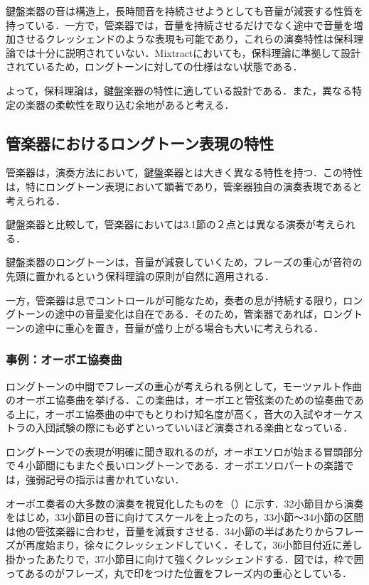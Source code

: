 鍵盤楽器の音は構造上，長時間音を持続させようとしても音量が減衰する性質を持っている．一方で，管楽器では，音量を持続させるだけでなく途中で音量を増加させるクレッシェンドのような表現も可能であり，これらの演奏特性は保科理論では十分に説明されていない．Mixtractにおいても，保科理論に準拠して設計されているため，ロングトーンに対しての仕様はない状態である．

よって，保科理論は，鍵盤楽器の特性に適している設計である．また，異なる特定の楽器の柔軟性を取り込む余地があると考える．
\subsection{管楽器におけるロングトーン表現の特性}
管楽器は，演奏方法において，鍵盤楽器とは大きく異なる特性を持つ．この特性は，特にロングトーン表現において顕著であり，管楽器独自の演奏表現であると考えられる．

鍵盤楽器と比較して，管楽器においては3.1節の２点とは異なる演奏が考えられる．

鍵盤楽器のロングトーンは，音量が減衰していくため，フレーズの重心が音符の先頭に置かれるという保科理論の原則が自然に適用される．

一方，管楽器は息でコントロールが可能なため，奏者の息が持続する限り，ロングトーンの途中の音量変化は自在である．そのため，管楽器であれば，ロングトーンの途中に重心を置き，音量が盛り上がる場合も大いに考えられる．
\subsubsection{事例：オーボエ協奏曲}
ロングトーンの中間でフレーズの重心が考えられる例として，モーツァルト作曲のオーボエ協奏曲\cite{oboe}を挙げる．この楽曲は，オーボエと管弦楽のための協奏曲である上に，オーボエ協奏曲の中でもとりわけ知名度が高く，音大の入試やオーケストラの入団試験の際にも必ずといっていいほど演奏される楽曲となっている．

ロングトーンでの表現が明確に聞き取れるのが，オーボエソロが始まる冒頭部分で４小節間にもまたぐ長いロングトーンである．オーボエソロパートの楽譜では，強弱記号の指示は書かれていない． 

オーボエ奏者の大多数の演奏を視覚化したものを（）に示す．32小節目から演奏をはじめ，33小節目の音に向けてスケールを上ったのち，33小節～34小節の区間は他の管弦楽器に合わせ，音量を減衰すさせる．34小節の半ばあたりからフレーズが再度始まり，徐々にクレッシェンドしていく．そして，36小節目付近に差し掛かったあたりで，37小節目に向けて強くクレッシェンドする．図では，枠で囲ってあるのがフレーズ，丸で印をつけた位置をフレーズ内の重心としている．

